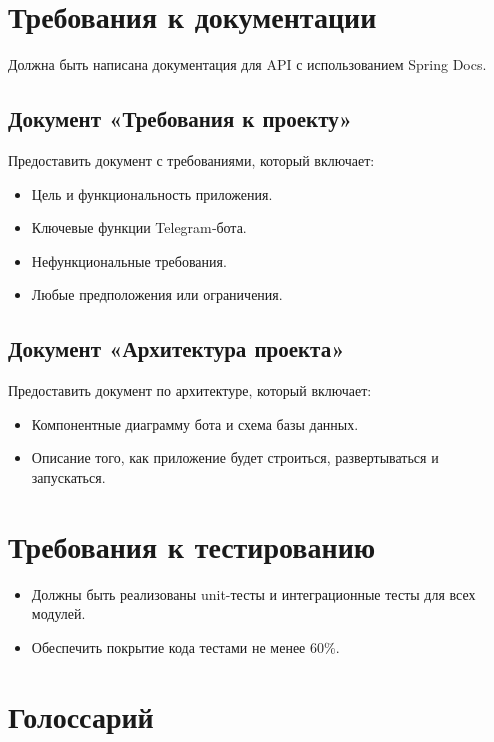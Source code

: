 \documentclass[areasetadvanced]{scrartcl}
\begin{document}
\section{Требования к документации}
Должна быть написана документация для API с использованием Spring Docs.
\subsection{Документ «Требования к проекту»}
Предоставить документ с требованиями, который включает:
\begin{itemize}
  \item Цель и функциональность приложения.
  \item Ключевые функции Telegram‑бота.
  \item Нефункциональные требования.
  \item Любые предположения или ограничения.
\end{itemize}

\subsection{Документ «Архитектура проекта»}
Предоставить документ по архитектуре, который включает:
\begin{itemize}
  \item Компонентные диаграмму бота и схема базы данных.
  \item Описание того, как приложение будет строиться, развертываться и запускаться.
\end{itemize}

\newpage
\section{Требования к тестированию}
\begin{itemize}
\item Должны быть реализованы unit-тесты и интеграционные тесты для
  всех модулей.
\item Обеспечить покрытие кода тестами не менее 60\%.
\end{itemize}
\newpage

\section{Голоссарий}
\end{document}
